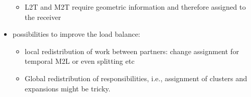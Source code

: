\documentclass[a4paper,11pt]{article}
\theoremstyle{plain}
\theoremstyle{definition}
\theoremstyle{remark}
\begin{document}
\begin{itemize}
\begin{itemize}
  \item L2T and M2T require geometric information and therefore assigned to the
    receiver
  \end{itemize}
\item possibilities to improve the load balance:
  \begin{itemize}
   \item local redistribution of work between partners: change assignment for
     temporal M2L or even splitting etc 
   \item Global redistribution of responsibilities, i.e., assignment of clusters
     and expansions might be tricky.
  \end{itemize}
\end{itemize}

% 
\end{document}
